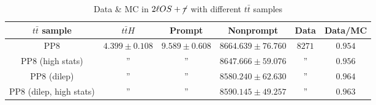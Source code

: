 \documentclass[11pt]{article}
\begin{document}
	\begin{table}[htp]
	\caption{Data \& MC in $2\ell OS+\cancel{\tau}$ with different $t\bar{t}$ samples}
	\begin{center}
	\begin{tabular}{|c|c|c|c|c|c|}
	\hline
	$t\bar{t}$ sample 	& $t\bar{t}H$	& Prompt		& Nonprompt		& 	 Data	& Data/MC \\
	\hline
	PP8 				& 	$4.399 \pm 0.108$ 		& $9.589 \pm 0.608$ 		& $8664.639 \pm 76.760$	&  $8271$ & $0.954$\\
	PP8 (high stats)		& 			''	 		&			''			& $8647.666 \pm 59.076$	&  	''	  & $0.956$\\
	PP8 (dilep) 			& 			''	 		& 			''			& $8580.240 \pm 62.630$	&   	''	  & $0.964$\\
	PP8 (dilep, high stats)	& 			''			& 			''	 		& $8590.145 \pm 49.257$	&   	''	  & $0.963$\\ 
	\hline
	\end{tabular}
	\end{center}
	\label{default}
	\end{table}%
	
\end{document}
